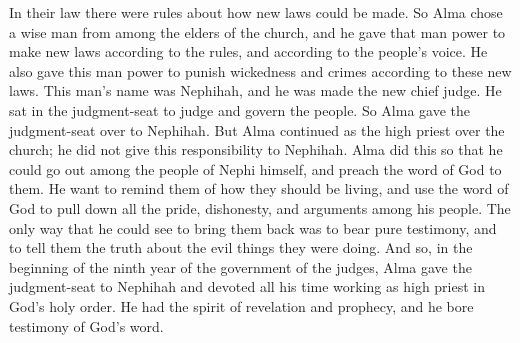 In their law there were rules about how new laws could be made. So Alma chose a wise man from among the elders of the church, and he gave that man power to make new laws according to the rules, and according to the people's voice. He also gave this man power to punish wickedness and crimes according to these new laws.
\bverse \iffalse Now this man's name was Nephihah, and he was appointed chief judge; and he sat in the judgment-seat to judge and to govern the people. \fi
This man's name was Nephihah, and he was made the new chief judge. He sat in the judgment-seat to judge and govern the people.
\bverse \iffalse Now Alma did not grant unto him the office of being high priest over the church, but he retained the office of high priest unto himself; but he delivered the judgment-seat unto Nephihah. \fi
So Alma gave the judgment-seat over to Nephihah. But Alma continued as the high priest over the church; he did not give this responsibility to Nephihah.
\bverse \iffalse And this he did that he himself might go forth among his people, or among the people of Nephi, that he might preach the word of God unto them, to stir them up in remembrance of their duty, and that he might pull down, by the word of God, all the pride and craftiness and all the contentions which were among his people, seeing no way that he might reclaim them save it were in bearing down in pure testimony against them. \fi
Alma did this so that he could go out among the people of Nephi himself, and preach the word of God to them. He want to remind them of how they should be living, and use the word of God to pull down all the pride, dishonesty, and arguments among his people. The only way that he could see to bring them back was to bear pure testimony, and to tell them the truth about the evil things they were doing.
\bverse \iffalse And thus in the commencement of the ninth year of the reign of the judges over the people of Nephi, Alma delivered up the judgment-seat to Nephihah, and confined himself wholly to the high priesthood of the holy order of God, to the testimony of the word, according to the spirit of revelation and prophecy. \fi
And so, in the beginning of the ninth year of the government of the judges, Alma gave the judgment-seat to Nephihah and devoted all his time working as high priest in God's holy order. He had the spirit of revelation and prophecy, and he bore testimony of God's word.
\bchapter
\bverse \iffalse Now it came to pass that Alma began to deliver the word of God unto the people, first in the land of Zarahemla, and from thence throughout all the land. \fi
